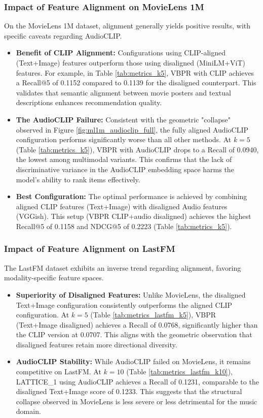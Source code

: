\subsubsection{Impact of Feature Alignment on MovieLens 1M}
On the MovieLens 1M dataset, alignment generally yields positive results, with specific caveats regarding AudioCLIP.
\begin{itemize}
    \item \textbf{Benefit of CLIP Alignment:} Configurations using CLIP-aligned (Text+Image) features outperform those using disaligned (MiniLM+ViT) features. For example, in Table \ref{tab:metrics_k5}, VBPR with CLIP achieves a Recall@5 of 0.1152 compared to 0.1139 for the disaligned counterpart. This validates that semantic alignment between movie posters and textual descriptions enhances recommendation quality.
    \item \textbf{The AudioCLIP Failure:} Consistent with the geometric "collapse" observed in Figure \ref{fig:ml1m_audioclip_full}, the fully aligned AudioCLIP configuration performs significantly worse than all other methods. At $k=5$ (Table \ref{tab:metrics_k5}), VBPR with AudioCLIP drops to a Recall of 0.0940, the lowest among multimodal variants. This confirms that the lack of discriminative variance in the AudioCLIP embedding space harms the model's ability to rank items effectively.
    \item \textbf{Best Configuration:} The optimal performance is achieved by combining aligned CLIP features (Text+Image) with disaligned Audio features (VGGish). This setup (VBPR CLIP+audio disaligned) achieves the highest Recall@5 of 0.1158 and NDCG@5 of 0.2223 (Table \ref{tab:metrics_k5}).
\end{itemize}

\subsubsection{Impact of Feature Alignment on LastFM}
The LastFM dataset exhibits an inverse trend regarding alignment, favoring modality-specific feature spaces.
\begin{itemize}
    \item \textbf{Superiority of Disaligned Features:} Unlike MovieLens, the disaligned Text+Image configuration consistently outperforms the aligned CLIP configuration. At $k=5$ (Table \ref{tab:metrics_lastfm_k5}), VBPR (Text+Image disaligned) achieves a Recall of 0.0768, significantly higher than the CLIP version at 0.0707. This aligns with the geometric observation that disaligned features retain more directional diversity.
    \item \textbf{AudioCLIP Stability:} While AudioCLIP failed on MovieLens, it remains competitive on LastFM. At $k=10$ (Table \ref{tab:metrics_lastfm_k10}), LATTICE\_1 using AudioCLIP achieves a Recall of 0.1231, comparable to the disaligned Text+Image score of 0.1233. This suggests that the structural collapse observed in MovieLens is less severe or less detrimental for the music domain.
\end{itemize}

